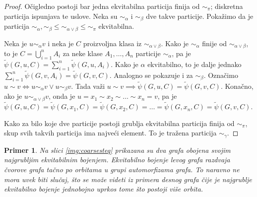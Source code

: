 \documentclass[12pt,oneside]{memoir}
\newtheorem{example}{Primer}
\theoremstyle{definition}
\begin{document}
  \begin{proof}
	  Očigledno postoji bar jedna ekvitabilna particija finija od $\sim_\pi$;
	  diskretna particija ispunjava te uslove.  Neka su $\sim_\alpha$ i
	  $\sim_\beta$ dve takve particije. Pokažimo da je particija
	  ${\sim_\alpha}, {\sim_\beta} \leq {\sim_{\alpha \lor \beta}} \leq
	  {\sim_\pi}$ ekvitabilna.

	  Neka je $u \sim_\alpha v$ i neka je $C$ proizvoljna klasa iz
	  $\sim_{\alpha \lor \beta}$. Kako je $\sim_\alpha$ finije od $\sim_{\alpha
	  \lor \beta}$, to je $C = \bigcup_{i=1}^n A_i$ za neke klase $A_1, \dots,
	  A_n$ particije $\sim_\alpha$, pa je $\widetilde{\psi}(G, u, C) =
	  \sum_{i=1}^n \widetilde{\psi}(G, u, A_i)$. Kako je $\alpha$ ekvitabilno,
	  to je dalje jednako $\sum_{i=1}^n \widetilde{\psi}(G, v, A_i) =
	  \widetilde{\psi}(G, v, C)$. Analogno se pokazuje i za $\sim_\beta$.
	  Označimo $u \sim v \iff u \sim_\alpha v \lor u \sim_\beta v$. Tada važi
	  $u \sim v \implies \widetilde{\psi}(G, u, C) = \widetilde{\psi}(G, v,
	  C)$.  Konačno, ako je $u \sim_{\alpha \lor \beta} v$, onda je $u = x_1
	  \sim x_2 \sim \dots \sim x_n = v$, pa je $\widetilde{\psi}(G, u, C) =
	  \widetilde{\psi}(G, x_1, C) = \widetilde{\psi}(G, x_2, C) = \dots =
	  \widetilde{\psi}(G, x_n, C) = \widetilde{\psi}(G, v, C)$.

	  Kako za bilo koje dve particije postoji grublja ekvitabilna particija
	  finija od $\sim_\pi$, skup svih takvih particija ima najveći element. To
	  je tražena particija $\sim_\gamma$.
  \end{proof}

  \begin{example}
	  Na slici \ref{img:coarsesteq} prikazana su dva grafa obojena svojim
	  najgrubljim ekvitabilnim bojenjem. Ekvitabilno bojenje levog grafa
	  razdvaja čvorove grafa tačno po orbitama u grupi automorfizama grafa. To
	  naravno ne mora uvek biti slučaj, što se može videti iz primera desnog
	  grafa čije je najgrublje ekvitabilno bojenje jednobojno uprkos tome što
	  postoji više orbita.
  \end{example}
\end{document}
